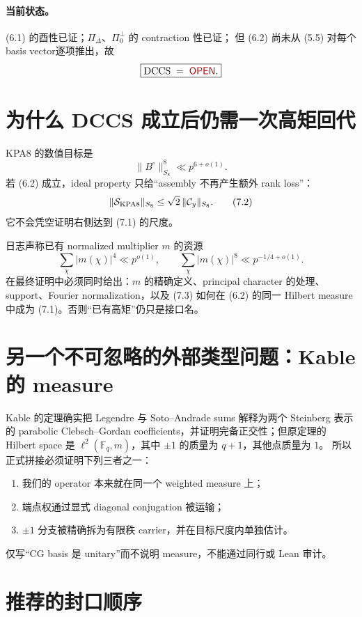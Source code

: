 \documentclass[11pt,a4paper]{ctexart}
\theoremstyle{definition}
\newcommand{\F}{\mathbb F}
\newcommand{\OPEN}{\textcolor{red!70!black}{\textsf{OPEN}}}
\begin{document}
\paragraph{当前状态。}
(6.1) 的酉性已证；$\Pi_\Delta$、$\Pi_0^\perp$ 的 contraction 性已证；
但 (6.2) 尚未从 (5.5) 对每个 basis vector逐项推出，故
\[
\boxed{\mathrm{DCCS}\;=\;\OPEN.}
\]

\section{为什么 DCCS 成立后仍需一次高矩回代}

KPA8 的数值目标是
\[
\boxed{\|B^\circ\|_{S_8}^8\ll p^{6+o(1)}.}
\tag{7.1}
\]
若 (6.2) 成立，ideal property 只给“assembly 不再产生额外 rank loss”：
\[
\|\mathcal S_{\rm KPA8}\|_{S_8}
\le \sqrt2\,\|\mathcal C_y\|_{S_8}.
\tag{7.2}
\]
它不会凭空证明右侧达到 (7.1) 的尺度。

日志声称已有 normalized multiplier $m$ 的资源
\[
\sum_\chi|m(\chi)|^4\ll p^{o(1)},
\qquad
\sum_\chi|m(\chi)|^8\ll p^{-1/4+o(1)}.
\tag{7.3}
\]
在最终证明中必须同时给出：$m$ 的精确定义、principal character 的处理、
support、Fourier normalization，以及 (7.3) 如何在 (6.2) 的同一 Hilbert
measure 中成为 (7.1)。否则“已有高矩”仍只是接口名。

\section{另一个不可忽略的外部类型问题：Kable 的 measure}

Kable 的定理确实把 Legendre 与 Soto--Andrade sums 解释为两个 Steinberg
表示的 parabolic Clebsch--Gordan coefficients，并证明完备正交性；但原定理的
Hilbert space 是 $\ell^2(\F_q,m)$，其中 $\pm1$ 的质量为 $q+1$，其他点质量为 $1$。
所以正式拼接必须证明下列三者之一：
\begin{enumerate}
\item 我们的 operator 本来就在同一个 weighted measure 上；
\item 端点权通过显式 diagonal conjugation 被运输；
\item $\pm1$ 分支被精确拆为有限秩 carrier，并在目标尺度内单独估计。
\end{enumerate}
仅写“CG basis 是 unitary”而不说明 measure，不能通过同行或 Lean 审计。

\section{推荐的封口顺序}
\end{document}
